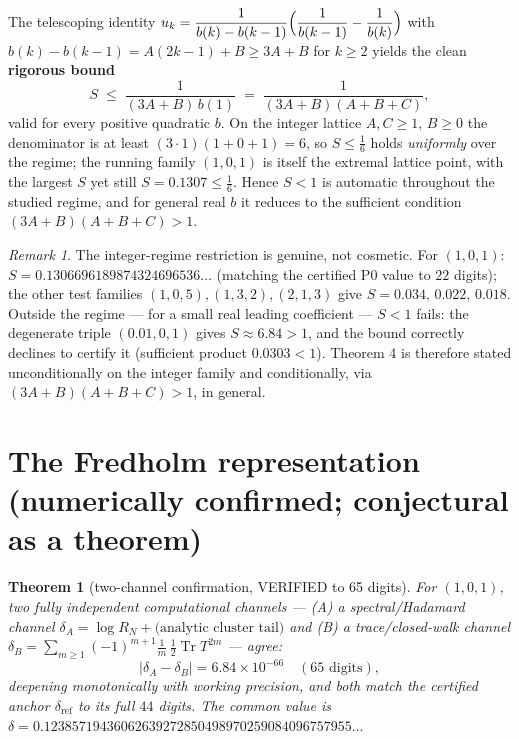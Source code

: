 \documentclass[
]{article}
\theoremstyle{plain}
\newtheorem{theorem}{Theorem}
\theoremstyle{remark}
\newtheorem*{remark}{Remark}
\begin{document}
The telescoping identity
\(u_k=\dfrac{1}{b(k)-b(k-1)}\Bigl(\dfrac1{b(k-1)}-\dfrac1{b(k)}\Bigr)\)
with \(b(k)-b(k-1)=A(2k-1)+B\ge 3A+B\) for \(k\ge2\) yields the clean
\textbf{rigorous bound} \[
S \;\le\; \frac{1}{(3A+B)\,b(1)} \;=\; \frac{1}{(3A+B)(A+B+C)},
\] valid for every positive quadratic \(b\). On the integer lattice
\(A,C\ge1\), \(B\ge0\) the denominator is at least
\((3{\cdot}1)(1{+}0{+}1)=6\), so \(S\le\tfrac16\) holds \emph{uniformly}
over the regime; the running family \((1,0,1)\) is itself the extremal
lattice point, with the largest \(S\) yet still \(S=0.1307\le\tfrac16\).
Hence \(S<1\) is automatic throughout the studied regime, and for
general real \(b\) it reduces to the sufficient condition
\((3A+B)(A+B+C)>1\).

\begin{remark}

The integer-regime restriction is genuine, not cosmetic. For
\((1,0,1)\): \(S=0.1306696189874324696536\ldots\) (matching the
certified P0 value to \(22\) digits); the other test families
\((1,0,5),(1,3,2),(2,1,3)\) give \(S=0.034,\,0.022,\,0.018\). Outside
the regime --- for a small real leading coefficient --- \(S<1\) fails:
the degenerate triple \((0.01,0,1)\) gives \(S\approx 6.84>1\), and the
bound correctly declines to certify it (sufficient product
\(0.0303<1\)). Theorem 4 is therefore stated unconditionally on the
integer family and conditionally, via \((3A+B)(A+B+C)>1\), in general.

\end{remark}

\section{The Fredholm representation (numerically confirmed; conjectural
as a
theorem)}\label{the-fredholm-representation-numerically-confirmed-conjectural-as-a-theorem}

\begin{theorem}[two-channel confirmation, VERIFIED to 65 digits]

For \((1,0,1)\), two fully independent computational channels --- (A) a
spectral/Hadamard channel
\(\delta_A=\log R_N+\text{(analytic cluster tail)}\) and (B) a
trace/closed-walk channel
\(\delta_B=\sum_{m\ge1}(-1)^{m+1}\tfrac1m\,\tfrac12\operatorname{Tr}T^{2m}\)
--- agree: \[
|\delta_A-\delta_B| = 6.84\times10^{-66}\quad(65\text{ digits}),
\] deepening monotonically with working precision, and both match the
certified anchor \(\delta_{\mathrm{ref}}\) to its full \(44\) digits.
The common value is
\(\delta=0.12385719436062639272850498970259084096757955\ldots\)

\end{theorem}
\end{document}
